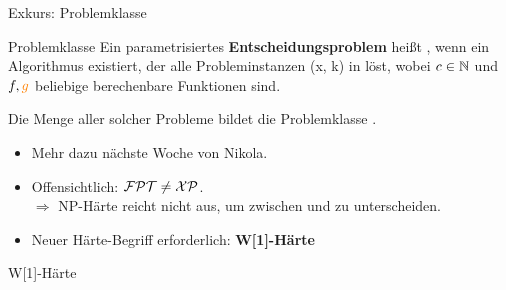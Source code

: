 \documentclass[navbaroff]{sdqbeamer}
\begin{document}
\begin{frame}[t]{Exkurs: Problemklasse \XP}
    \begin{blueblock}{Problemklasse \XP}
        Ein parametrisiertes \textbf{Entscheidungsproblem} heißt ,
        wenn ein Algorithmus existiert, der alle Probleminstanzen (x, k) in  löst, wobei $ c \in \mathbb{N} $ und $f, \textcolor{orange}{g}$ beliebige berechenbare Funktionen sind.

        \vspace{10pt}
        Die Menge aller solcher Probleme bildet die Problemklasse \blue{\XP}.
    \end{blueblock}
    \begin{itemize}
        \item Mehr dazu nächste Woche von Nikola.
        \item Offensichtlich: $\mathcal{FPT} \neq \mathcal{XP}$.
        \\$\Rightarrow$ NP-Härte reicht nicht aus, um zwischen \FPT und \XP zu unterscheiden.
        \item Neuer Härte-Begriff erforderlich: \textbf{W[1]-Härte}
    \end{itemize}
\end{frame}

\begin{frame}{W[1]-Härte}
    
\end{frame}
\end{document}
